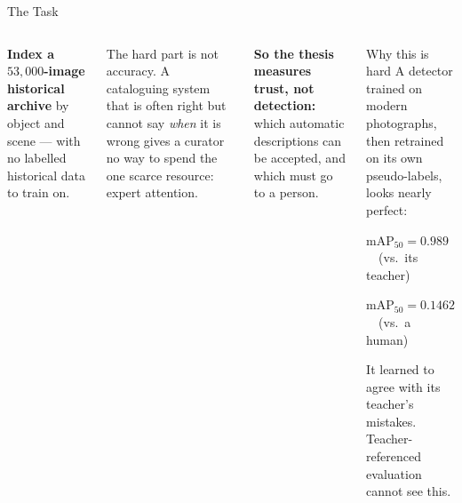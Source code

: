 \documentclass[aspectratio=169,11pt]{beamer}
\begin{document}
\begin{frame}{The Task}
\begin{columns}[T]
\small
\textbf{Index a $53{,}000$-image historical archive} by object and scene --- with no labelled historical data to train on.
\vspace{2mm}

The hard part is not accuracy. A cataloguing system that is often right but cannot say \emph{when} it is wrong gives a curator no way to spend the one scarce resource: expert attention.
\vspace{2mm}

\textbf{So the thesis measures trust, not detection:} which automatic descriptions can be accepted, and which must go to a person.

\begin{block}{\small Why this is hard}
\footnotesize A detector trained on modern photographs, then retrained on its own pseudo-labels, looks nearly perfect:
\vspace{1mm}
\begin{center}
$\text{mAP}_{50} = \mathbf{0.989}$ \ \ (vs.\ its teacher)
\vspace{1mm}

$\text{mAP}_{50} = \mathbf{0.1462}$ \ \ (vs.\ a human)
\end{center}
\vspace{1mm}
It learned to agree with its teacher's mistakes. Teacher-referenced evaluation cannot see this.
\end{block}
\end{columns}
\end{frame}
\end{document}
